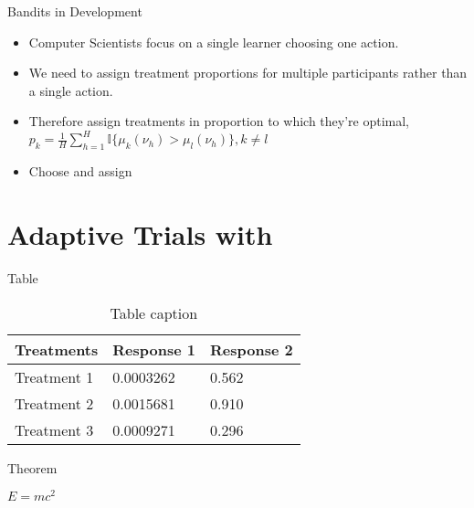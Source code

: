 \documentclass[aspectratio=169,xcolor=dvipsnames]{beamer}
\begin{document}
\begin{frame}{Bandits in Development}
    \begin{itemize}
        \item Computer Scientists focus on a single learner choosing one action.
        \item We need to assign treatment proportions for multiple participants rather 
        than a single action.
        \item Therefore assign treatments in proportion to which they're optimal,
        $p_k = \frac{1}{H} \sum^H_{h=1} \mathbb{I}\{\mu_k(\nu_{h})  > \mu_l(\nu_{h}) \}, k \neq l$
    \item Choose  and assign 
    \end{itemize}
\end{frame}
\section{Adaptive Trials with}

\begin{frame}{Table}
    \begin{table}
        \begin{tabular}{l l l}
            \toprule
            \textbf{Treatments} & \textbf{Response 1} & \textbf{Response 2} \\
            \midrule
            Treatment 1         & 0.0003262           & 0.562               \\
            Treatment 2         & 0.0015681           & 0.910               \\
            Treatment 3         & 0.0009271           & 0.296               \\
            \bottomrule
        \end{tabular}
        \caption{Table caption}
    \end{table}
\end{frame}


\begin{frame}{Theorem}
    \begin{theorem}
        $E = mc^2$
    \end{theorem}
\end{frame}

\end{document}
